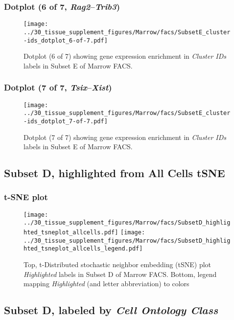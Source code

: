 \clearpage

\subsubsection{Dotplot (6 of 7, \emph{Rag2}--\emph{Trib3})}
\begin{figure}[h]
\centering
\texttt{[image: ../30\_tissue\_supplement\_figures/Marrow/facs/SubsetE\_cluster-ids\_dotplot\_6-of-7.pdf]}

\caption{ Dotplot (6 of 7)  showing gene expression enrichment in \emph{Cluster IDs} labels in Subset E of Marrow FACS. }
\end{figure}


\clearpage

\subsubsection{Dotplot (7 of 7, \emph{Tsix}--\emph{Xist})}
\begin{figure}[h]
\centering
\texttt{[image: ../30\_tissue\_supplement\_figures/Marrow/facs/SubsetE\_cluster-ids\_dotplot\_7-of-7.pdf]}

\caption{ Dotplot (7 of 7)  showing gene expression enrichment in \emph{Cluster IDs} labels in Subset E of Marrow FACS. }
\end{figure}


\clearpage
\subsection{Subset D, highlighted from All Cells tSNE}
\subsubsection{t-SNE plot}
\begin{figure}[h]
\centering
\texttt{[image: ../30\_tissue\_supplement\_figures/Marrow/facs/SubsetD\_highlighted\_tsneplot\_allcells.pdf]}
\texttt{[image: ../30\_tissue\_supplement\_figures/Marrow/facs/SubsetD\_highlighted\_tsneplot\_allcells\_legend.pdf]}
\caption{Top, t-Distributed stochastic neighbor embedding (tSNE) plot  \emph{Highlighted} labels in Subset D of Marrow FACS. Bottom, legend mapping \emph{Highlighted} (and letter abbreviation) to colors}
\end{figure}


\clearpage

\subsection{Subset D, labeled by \emph{Cell Ontology Class}}

